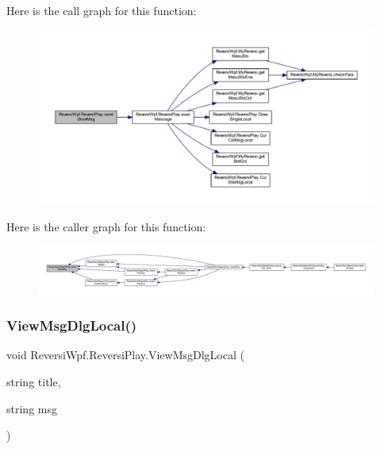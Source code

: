 Here is the call graph for this function\+:\nopagebreak
\begin{figure}[H]
\begin{center}
\leavevmode
\includegraphics[width=350pt]{class_reversi_wpf_1_1_reversi_play_acf2427a8a68d437b792975866fbf754d_cgraph}
\end{center}
\end{figure}
Here is the caller graph for this function\+:\nopagebreak
\begin{figure}[H]
\begin{center}
\leavevmode
\includegraphics[width=350pt]{class_reversi_wpf_1_1_reversi_play_acf2427a8a68d437b792975866fbf754d_icgraph}
\end{center}
\end{figure}
\mbox{\label{class_reversi_wpf_1_1_reversi_play_a3c3009d24aebf02f92d62b79ea01934c}} 
\subsubsection{\texorpdfstring{View\+Msg\+Dlg\+Local()}{ViewMsgDlgLocal()}}
{\footnotesize\ttfamily void Reversi\+Wpf.\+Reversi\+Play.\+View\+Msg\+Dlg\+Local (\begin{DoxyParamCaption}\item[{string}]{title,  }\item[{string}]{msg }\end{DoxyParamCaption})\hspace{0.3cm}{\ttfamily [private]}}



